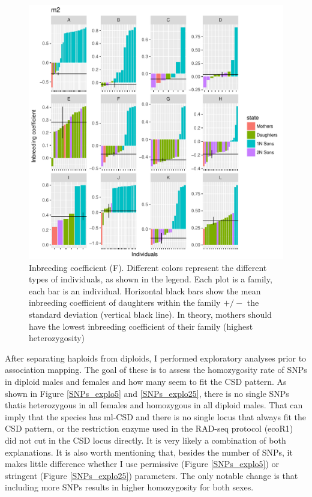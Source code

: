 \documentclass[10pt,a4paper]{report}
\begin{document}
\begin{figure}[h]
	\begin{center}
		\hspace*{-0.8in}
		\includegraphics[width=1.2\textwidth]{exclu_haplo/m2}
		
		\caption{Inbreeding coefficient (F). Different colors represent the different types of individuals, as shown in the legend. Each plot is a family, each bar is an individual. Horizontal black bars show the mean inbreeding coefficient of daughters within the family $+/-$ the standard deviation (vertical black line). In theory, mothers should have the lowest inbreeding coefficient of their family (highest heterozygosity)}
		\label{haplodiplo}
	\end{center}
\end{figure}

\FloatBarrier

After separating haploids from diploids, I performed exploratory analyses prior to association mapping. The goal of these is to assess the homozygosity rate of SNPs in diploid males and females and how many seem to fit the CSD pattern. As shown in Figure \ref{SNPs_explo5} and \ref{SNPs_explo25}, there is no single SNPs thatis heterozygous in all females and homozygous in all diploid males. That can imply that the species has ml-CSD and there is no single locus that always fit the CSD pattern, or the restriction enzyme used in the RAD-seq protocol (ecoR1) did not cut in the CSD locus directly. It is very likely a combination of both explanations. It is also worth mentioning that, besides the number of SNPs, it makes little difference whether I use permissive (Figure \ref{SNPs_explo5}) or stringent (Figure \ref{SNPs_explo25}) parameters. The only notable change is that including more SNPs results in higher homozygosity for both sexes.
\end{document}
